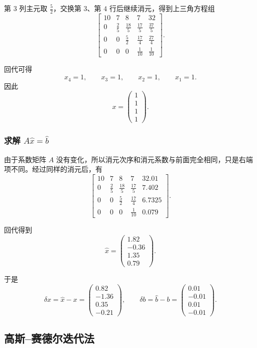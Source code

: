 \documentclass[12pt,a4paper]{ctexart}
\begin{document}
第 $3$ 列主元取 $\frac{5}{2}$，交换第 $3$、第 $4$ 行后继续消元，得到上三角方程组
\[
\left[
\begin{array}{cccc|c}
10&7&8&7&32\\
0&\frac{2}{5}&\frac{18}{5}&\frac{17}{5}&\frac{37}{5}\\
0&0&\frac{5}{2}&\frac{17}{4}&\frac{27}{4}\\
0&0&0&\frac{1}{10}&\frac{1}{10}
\end{array}
\right].
\]

回代可得
\[
x_4=1,\qquad x_3=1,\qquad x_2=1,\qquad x_1=1.
\]
因此
\[
x=
\begin{pmatrix}
1\\1\\1\\1
\end{pmatrix}.
\]

\subsubsection{求解 $A\hat{x}=\hat{b}$}

由于系数矩阵 $A$ 没有变化，所以消元次序和消元系数与前面完全相同，只是右端项不同。经过同样的消元后，有
\[
\left[
\begin{array}{cccc|c}
10&7&8&7&32.01\\
0&\frac{2}{5}&\frac{18}{5}&\frac{17}{5}&7.402\\
0&0&\frac{5}{2}&\frac{17}{4}&6.7325\\
0&0&0&\frac{1}{10}&0.079
\end{array}
\right].
\]

回代得到
\[
\hat{x}=
\begin{pmatrix}
1.82\\-0.36\\1.35\\0.79
\end{pmatrix}.
\]

于是
\[
\delta x=
\hat{x}-x=
\begin{pmatrix}
0.82\\-1.36\\0.35\\-0.21
\end{pmatrix},
\qquad
\delta b=
\hat{b}-b=
\begin{pmatrix}
0.01\\-0.01\\0.01\\-0.01
\end{pmatrix}.
\]

\subsection{高斯--赛德尔迭代法}
\end{document}
